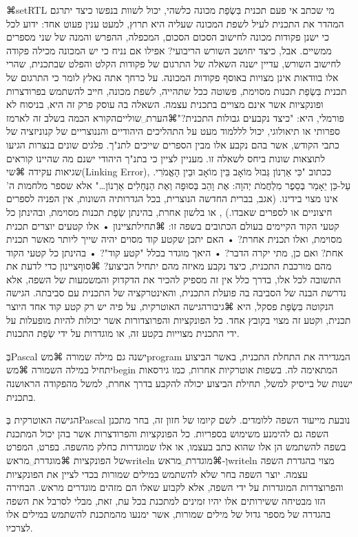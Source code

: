 {\begin{lstlisting}[frame=single]
\end{lstlisting}
⌘setRTL{}
מי שכתב אי פעם תכנית בִּשְׂפַת  מכונה כלשהי, יכול לשוות בנפשו כיצד יתרגם המהדר את התכנית לעיל לשפת המכונה שעליה היא תרוץ, למעט ענין פעוט אחד: ידוע לכל כי ישנן פקודות מכונה לחישוב הסכום הסכום, המכפלה, ההפרש והמנה של שני מספרים ממשיים. אבל, כיצד יחושב השורש הריבועי? אפילו אם נניח כי יש המכונה מכילה פקודה לחישוב השורש, עדיין ישנה השאלה של התרגום של פקודות הקלט והפלט שבתכנית, שהרי אלו בוודאות אינן מצויות באוסף פקודות המכונה.
על כרחך אתה נאלץ לומר כי התרגום של תכנית בִּשְׂפַת  תכנות מסוימת, פשוטה ככל שתהייה, לשפת מכונה, חייב להשתמש בפרודצרות ופונקציות אשר אינם מצויים בתכנית עצמה. השאלה בה עוסק פרק זה היא, בניסוח לא פורמלי, היא: "כיצד נקבעים גבולות התכנית?"⌘הערת␣שוליים{הקורא הכמה בשלב זה לארמז ספרותי או תיאולוגי, יכול לללמוד מעט על התהליכים היהודיים והננוצריים של קנוניזציה של כתבי הקודש, אשר בהם נקבע אלו מבין הספרים שייכים לתנ"ך. פלגים שונים בנצרות הגיעו לתוצאות שונות ביחס לשאלה זו. מעניין לציין כי בתנ"ך היהודי ישנם מה שהיינו קוראים שגיאות עקידה ⌘שי{(Linking Error)}, ככתוב "כִּי אַרְנוֹן גְּבוּל מוֹאָב בֵּין מוֹאָב וּבֵין הָאֱמֹרִי. עַל-כֵּן יֵאָמַר בְּסֵפֶר מִלְחֲמֹת יְהוָה: אֶת וָהֵב בְּסוּפָה וְאֶת הַנְּחָלִים אַרְנוֹן…" אלא שספר מלחמות ה' אינו מצוי בידינו. (אגב, בברית החדשה הנוצרית, בכל הגדרותיה השונות, אין הפניה לספרים חיצוניים או לספרים שאבדו.)
}, או בלשון אחרת, בהינתן שְׂפַת תכנות מסוימת, ובהינתן כל קטעי הקוד הקיימים בעולם הכתובים בשפה זו:
⌘תחילת{ציינון}
• אלו קטעים יוצרים תכנית מסוימת, ואלו תכנית אחרת?
• האם יתכן שקטע קוד מסוים יהיה שייך ליותר מאשר תכנית אחת? ואם כן, מתי יקרה הדבר?
• היאך מוגדר בכלל "קטע קוד"?
• בהינתן כל קטעי הקוד מהם מורכבת התכנית, כיצד נקבע מאיזה מהם יתחיל הביצוע?
⌘סוף{ציינון}
כדי לדעת את התשובה לכל אלו, בדרך כלל אין זה מספיק להכיר את הדקדוק והמשמעות של השפה, אלא נדרשת הבנה של הסביבה בה פועלת התכנית, והאינטרקציה של התכנית עם סביבתה.
הגישה הנקוטה בִּשְׂפַת  פסקל, היא ⌘גיבור{הגישה האוטרקית}, על פיה יש רק קטע קוד אחד היוצר תכנית, וקטע זה מצוי בקובץ אחד. כל הפונקציות והפרוצדורות אשר יכולות להיות מופעלות על ידי התכנית מצוייות בקטע זה, או מוגדרות על ידי שְׂפַת התכנות.

בְּPascal ישנה גם מילה שמורה ⌘מש{program} המגדירה את התחלת התכנית, באשר הביצוע יתחיל במילה השמורה ⌘מש{begin} המתאימה לה. בשפות אוטרקיות אחרות, כמו גירסאות ישנות של בייסיק למשל, תחילת הביצוע יכולה להקבע בדרך אחרת, למשל מהפקודה הראושנה בתכנית.

הגישה האוטרקית בְּPascal נובעת מייעוד השפה ללומדים. לשם קיומו של חזון זה, בחר מתכנן השפה גם להימנע משימוש בספריות. כל הפונקציות והפרודצרות אשר בהן יכול המתכנת בשפה להשתמש הן אלו שהוא כתב בעצמו, או אלו שמוגדרות כחלק מהשפה. בפרט, המפרט של הפונקציות ⌘מוגדרת␣מראש{writeln} וְ-⌘מוגדרת␣מראש{writeln} מצוי בהגדרת השפה עצמה. יוצר השפה בחר שלא להשתמש במילים שמורות בכדי לציין את הפונקציות והפרוצדרות המוגדרות על ידי השפה, אלא לקבוע שאלו הם מזהים מוגדרים מראש. הבחירה הזו מבטיחה ששירותים אלו יהיו זמינים למתכנת בכל עת, זאת, מבלי לסרבל את השפה בהגדרה של מספר גדול של מילים שמורות, אשר ימנעו מהמתכנת להשתמש במילים אלו לצרכיו.

}
